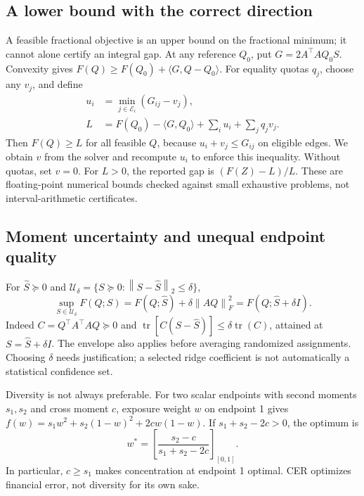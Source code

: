 \documentclass[11pt]{article}
\newcommand{\tr}{\operatorname{tr}}
\newcommand{\norm}[1]{\left\lVert#1\right\rVert}
\begin{document}
\subsection{A lower bound with the correct direction}
A feasible fractional objective is an upper bound on the fractional minimum; it cannot alone certify an integral gap. At any reference \(Q_0\), put \(G=2A^\top A Q_0S\). Convexity gives
\(F(Q)\ge F(Q_0)+\langle G,Q-Q_0\rangle\).
For equality quotas \(q_j\), choose any \(v_j\), and define
\begin{equation}
 \begin{split}
 u_i&=\min_{j\in\mathcal E_i}(G_{ij}-v_j),\\
 L&=F(Q_0)-\langle G,Q_0\rangle+\sum_i u_i+\sum_jq_jv_j .
 \end{split}\label{eq:dual}
\end{equation}
Then \(F(Q)\ge L\) for all feasible \(Q\), because \(u_i+v_j\le G_{ij}\) on eligible edges. We obtain \(v\) from the solver and recompute \(u_i\) to enforce this inequality. Without quotas, set \(v=0\). For \(L>0\), the reported gap is \((F(Z)-L)/L\). These are floating-point numerical bounds checked against small exhaustive problems, not interval-arithmetic certificates.

\subsection{Moment uncertainty and unequal endpoint quality}
For \(\widehat S\succeq0\) and
\(\mathcal U_\delta=\{S\succeq0:\norm{S-\widehat S}_2\le\delta\}\),
\begin{equation}
 \sup_{S\in\mathcal U_\delta}F(Q;S)
 =F(Q;\widehat S)+\delta\norm{AQ}_F^2
 =F(Q;\widehat S+\delta I).
 \label{eq:robust}
\end{equation}
Indeed \(C=Q^\top A^\top AQ\succeq0\) and
\(\tr[C(S-\widehat S)]\le\delta\tr(C)\), attained at
\(S=\widehat S+\delta I\). The envelope also applies before averaging randomized assignments. Choosing \(\delta\) needs justification; a selected ridge coefficient is not automatically a statistical confidence set.

Diversity is not always preferable. For two scalar endpoints with second moments \(s_1,s_2\) and cross moment \(c\), exposure weight \(w\) on endpoint 1 gives
\(f(w)=s_1w^2+s_2(1-w)^2+2cw(1-w)\).
If \(s_1+s_2-2c>0\), the optimum is
\begin{equation}
 w^*=\left[\frac{s_2-c}{s_1+s_2-2c}\right]_{[0,1]}.
 \label{eq:quality}
\end{equation}
In particular, \(c\ge s_1\) makes concentration at endpoint 1 optimal. CER optimizes financial error, not diversity for its own sake.
\end{document}
